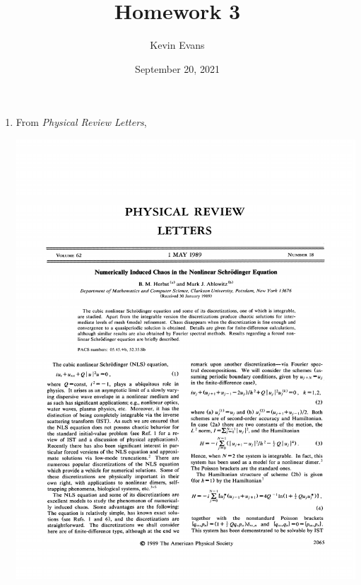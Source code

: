 \documentclass{homework}
\title{Homework 3}
\author{Kevin Evans}
\date{September 20, 2021}
\begin{document}
	\maketitle
	\begin{enumerate}
		\item From \textit{Physical Review Letters}, \begin{center}
			\includegraphics[width=0.9\linewidth]{herbst1989.pdf}
			

\end{center}
\end{enumerate}
\end{document}
